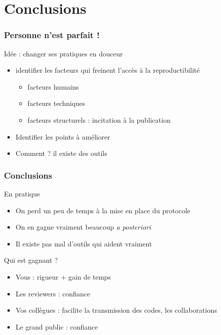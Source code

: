 \section{Conclusions}

\begin{frame}
  \frametitle{Personne n'est parfait !}

\begin{block}{Idée : changer ses pratiques en douceur  }  

\begin{itemize}
  \item identifier les facteurs qui freinent l'accès à la reproductibilité
    \begin{itemize}
  \item[$\circ$] facteurs humains
  \item[$\circ$] facteurs techniques
  \item[$\circ$] facteurs structurels : incitation à la publication
 \end{itemize}   
 \item Identifier les points à améliorer 
 \item Comment ? il existe des outils 
\end{itemize}
\end{block}
%
\end{frame}

\begin{frame}
  \frametitle{Conclusions}
\begin{block}{En pratique }
\begin{itemize}
\item On perd un peu de temps à la mise en place du protocole 
\item On en gagne vraiment beaucoup \textit{a posteriori}
\item Il existe pas mal d'outils qui aident vraiment 
\end{itemize}
\end{block}

\begin{block}{Qui est gagnant ? }
\begin{itemize}
\item Vous : rigueur + gain de temps
\item Les reviewers : confiance
\item Vos collègues : facilite la transmission des codes, les collaborations  
\item Le grand public : confiance
\end{itemize}
\end{block}
\end{frame}


